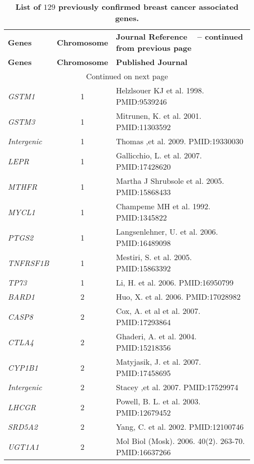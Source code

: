 \documentclass[10pt]{article}
\begin{document}
\newpage
\begin{landscape}
\begin{center}
\begin{longtable}[H]{lcl}
\caption{\textbf{List of $129$ previously confirmed breast cancer associated genes.}}\\ \hline\hline
\textbf{Genes} & \textbf{Chromosome} & \textbf{Journal Reference} \endfirsthead  
\multicolumn{3}{c}%
{{\bfseries \tablename\ \thetable{} -- continued from previous page}} \\
\textbf{Genes} & \textbf{Chromosome} & \textbf{Published Journal}  \\ \hline
\endhead 
\hline \multicolumn{3}{c}{{Continued on next page}}\\ \hline
\endfoot
\hline\hline
\endlastfoot
\hline 
\textit{GSTM1} & 1 & Helzlsouer KJ et al. 1998. PMID:9539246\\[2pt]
\textit{GSTM3} & 1 & Mitrunen, K.  et al. 2001. PMID:11303592\\[2pt]
\textit{Intergenic} & 1 & Thomas ,et al. 2009. PMID:19330030\\[2pt]
\textit{LEPR} & 1 & Gallicchio, L.  et al. 2007. PMID:17428620\\[2pt]
\textit{MTHFR} & 1 & Martha J Shrubsole  et al.  2005. PMID:15868433\\[2pt]
\textit{MYCL1} & 1 & Champeme MH et al. 1992. PMID:1345822\\[2pt]
\textit{PTGS2} & 1 & Langsenlehner, U.  et al. 2006. PMID:16489098\\[2pt]
\textit{TNFRSF1B} & 1 & Mestiri, S.  et al. 2005. PMID:15863392\\[2pt]
\textit{TP73} & 1 & Li, H.  et al. 2006. PMID:16950799\\[2pt]
\textit{BARD1} & 2 & Huo, X.  et al. 2006. PMID:17028982\\[2pt]
\textit{CASP8} & 2 & Cox, A. et al  et al. 2007. PMID:17293864\\[2pt]
\textit{CTLA4} & 2 & Ghaderi, A.  et al. 2004. PMID:15218356\\[2pt]
\textit{CYP1B1} & 2 & Matyjasik, J.  et al. 2007. PMID:17458695\\[2pt]
\textit{Intergenic} & 2 & Stacey ,et al. 2007. PMID:17529974\\[2pt]
\textit{LHCGR} & 2 & Powell, B. L.  et al. 2003. PMID:12679452\\[2pt]
\textit{SRD5A2} & 2 & Yang, C.  et al. 2002. PMID:12100746\\[2pt]
\textit{UGT1A1} & 2 & Mol Biol (Mosk). 2006. 40(2). 263-70. PMID:16637266\\[2pt]

\end{longtable}
\end{center}
\end{landscape}
\end{document}
